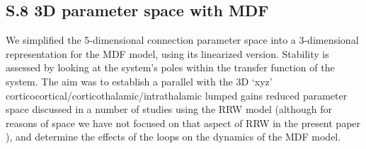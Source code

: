 \documentclass[12pt,twoside]{article}
\begin{document}
\newpage
\subsection*{S.8 3D parameter space with MDF}

We simplified the 5-dimensional connection parameter space into a 3-dimensional representation for the MDF model, using its linearized version. Stability is assessed by looking at the system's poles within the transfer function of the system.
The aim was to establish a parallel with the 3D `xyz' corticocortical/corticothalamic/intrathalamic lumped gains reduced parameter space discussed in a number of studies using the RRW model (although for reasons of space we have not focused on that aspect of RRW in the present paper \citealp{robinson2002dynamics,robinson2005multiscale, roberts2012corticothalamic, breakspear2006unifying, abeysuriya2015physiologically}), and determine the effects of the loops on the dynamics of the MDF model.
\end{document}
